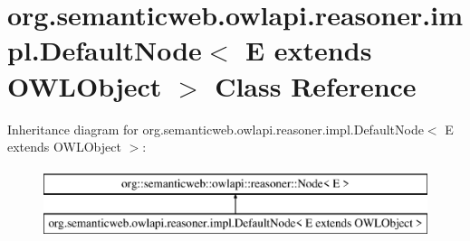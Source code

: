 \hypertarget{classorg_1_1semanticweb_1_1owlapi_1_1reasoner_1_1impl_1_1_default_node_3_01_e_01extends_01_o_w_l_object_01_4}{\section{org.\-semanticweb.\-owlapi.\-reasoner.\-impl.\-Default\-Node$<$ E extends O\-W\-L\-Object $>$ Class Reference}
\label{classorg_1_1semanticweb_1_1owlapi_1_1reasoner_1_1impl_1_1_default_node_3_01_e_01extends_01_o_w_l_object_01_4}
}
Inheritance diagram for org.\-semanticweb.\-owlapi.\-reasoner.\-impl.\-Default\-Node$<$ E extends O\-W\-L\-Object $>$\-:\begin{figure}[H]
\begin{center}
\leavevmode
\includegraphics[height=2.000000cm]{classorg_1_1semanticweb_1_1owlapi_1_1reasoner_1_1impl_1_1_default_node_3_01_e_01extends_01_o_w_l_object_01_4}
\end{center}
\end{figure}
